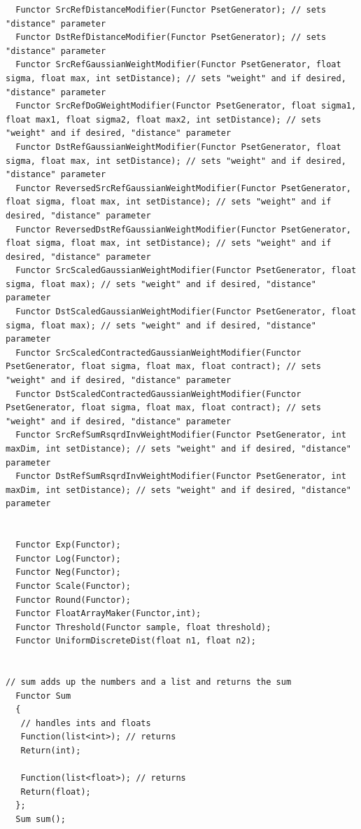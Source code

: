\begin{verbatim}
  Functor SrcRefDistanceModifier(Functor PsetGenerator); // sets "distance" parameter
  Functor DstRefDistanceModifier(Functor PsetGenerator); // sets "distance" parameter
  Functor SrcRefGaussianWeightModifier(Functor PsetGenerator, float sigma, float max, int setDistance); // sets "weight" and if desired, "distance" parameter
  Functor SrcRefDoGWeightModifier(Functor PsetGenerator, float sigma1, float max1, float sigma2, float max2, int setDistance); // sets "weight" and if desired, "distance" parameter
  Functor DstRefGaussianWeightModifier(Functor PsetGenerator, float sigma, float max, int setDistance); // sets "weight" and if desired, "distance" parameter
  Functor ReversedSrcRefGaussianWeightModifier(Functor PsetGenerator, float sigma, float max, int setDistance); // sets "weight" and if desired, "distance" parameter
  Functor ReversedDstRefGaussianWeightModifier(Functor PsetGenerator, float sigma, float max, int setDistance); // sets "weight" and if desired, "distance" parameter
  Functor SrcScaledGaussianWeightModifier(Functor PsetGenerator, float sigma, float max); // sets "weight" and if desired, "distance" parameter
  Functor DstScaledGaussianWeightModifier(Functor PsetGenerator, float sigma, float max); // sets "weight" and if desired, "distance" parameter
  Functor SrcScaledContractedGaussianWeightModifier(Functor PsetGenerator, float sigma, float max, float contract); // sets "weight" and if desired, "distance" parameter
  Functor DstScaledContractedGaussianWeightModifier(Functor PsetGenerator, float sigma, float max, float contract); // sets "weight" and if desired, "distance" parameter
  Functor SrcRefSumRsqrdInvWeightModifier(Functor PsetGenerator, int maxDim, int setDistance); // sets "weight" and if desired, "distance" parameter
  Functor DstRefSumRsqrdInvWeightModifier(Functor PsetGenerator, int maxDim, int setDistance); // sets "weight" and if desired, "distance" parameter


  Functor Exp(Functor);
  Functor Log(Functor);
  Functor Neg(Functor);
  Functor Scale(Functor);
  Functor Round(Functor);
  Functor FloatArrayMaker(Functor,int);
  Functor Threshold(Functor sample, float threshold);
  Functor UniformDiscreteDist(float n1, float n2);


// sum adds up the numbers and a list and returns the sum
  Functor Sum
  {
   // handles ints and floats
   Function(list<int>); // returns
   Return(int);

   Function(list<float>); // returns
   Return(float);
  };
  Sum sum();

\end{verbatim}

